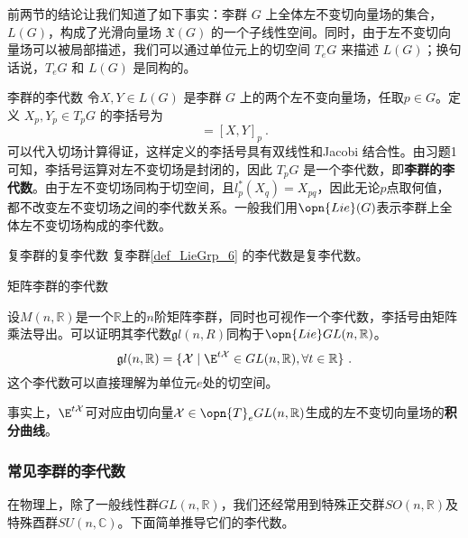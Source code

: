 前两节的结论让我们知道了如下事实：李群 $G$ 上全体左不变切向量场的集合，$L(G)$，构成了光滑向量场 $\mathfrak{X}(G)$ 的一个子线性空间。同时，由于左不变切向量场可以被局部描述，我们可以通过单位元上的切空间 $T_eG$ 来描述 $L(G)$；换句话说，$T_eG$ 和 $L(G)$ 是同构的。

\begin{definition}{李群的李代数}
令$X, Y\in L(G)$ 是李群 $G$ 上的两个左不变向量场，任取$p\in G$。定义 $X_p, Y_p\in T_pG$ 的李括号为
\begin{equation}
[X_p, Y_p]=[X, Y]_p~.
\end{equation}
可以代入切场计算得证，这样定义的李括号具有双线性和Jacobi 结合性。由习题1可知，李括号运算对左不变切场是封闭的，因此 $T_p G$ 是一个李代数，即\textbf{李群的李代数}。由于左不变切场同构于切空间，且$l_p^*(X_q)=X_{pq}$，因此无论$p$点取何值，都不改变左不变切场之间的李代数关系。一般我们用$\opn{Lie}(G)$表示李群上全体左不变切场构成的李代数。
\end{definition}




\begin{theorem}{复李群的复李代数}
复李群\autoref{def_LieGrp_6} 的李代数是复李代数。
\end{theorem}



\begin{example}{矩阵李群的李代数}

设$M(n,\mathbb R)$是一个$\mathbb{R}$上的$n$阶矩阵李群，同时也可视作一个李代数，李括号由矩阵乘法导出。可以证明其李代数$\mathfrak gl(n,R)$同构于$\opn{Lie}GL(n,\mathbb R)$。
\begin{equation}\label{eq_LieGA_3}
\mathfrak gl(n,\mathbb R) = \{ \mathcal{X} \mid \E^{t\mathcal{X}}\in GL(n,\mathbb R), \forall t\in\mathbb{R} \}~.
\end{equation}
这个李代数可以直接理解为单位元$e$处的切空间。

事实上，$\E^{t\mathcal{X}}$可对应由切向量$\mathcal{X}\in\opn{T}_e GL(n,\mathbb R)$生成的左不变切向量场的\textbf{积分曲线}。

\end{example}
\subsubsection{常见李群的李代数}
在物理上，除了一般线性群$GL(n,\mathbb R)$，我们还经常用到特殊正交群$SO(n,\mathbb R)$及特殊酉群$SU(n,\mathbb C)$。下面简单推导它们的李代数。

